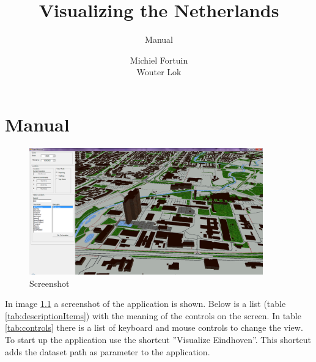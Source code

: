 \documentclass[11pt,a4paper]{report}
\title{Visualizing the Netherlands}
\subtitle{Manual}
\author{Michiel Fortuin\\Wouter Lok}
\begin{document}
\maketitle

\chapter{Manual}
\begin{figure}[htb!]
    \centering
    \includegraphics[width=0.9\textwidth]{ManualImage}
    \caption{Screenshot}
    \label{fig:Screenshot}
\end{figure}

In image \ref{fig:Screenshot} a screenshot of the application is shown. Below is a list (table \ref{tab:descriptionItems}) with the meaning of the controls on the screen. In table \ref{tab:controls} there is a list of keyboard and mouse controls to change the view. To start up the application use the shortcut ''Visualize Eindhoven''. This shortcut adds the dataset path as parameter to the application.
\end{document}
